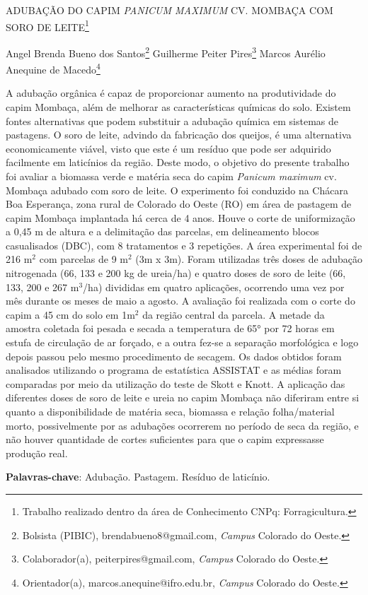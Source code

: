 \documentclass[article,12pt,onesidea,4paper,english,brazil]{abntex2}
\begin{document}
	
	
	\frenchspacing 
	
	\begin{center}
		\LARGE ADUBAÇÃO DO CAPIM \textit{PANICUM MAXIMUM} CV. MOMBAÇA COM SORO DE LEITE\footnote{Trabalho realizado dentro da área de Conhecimento CNPq: Forragicultura.}
		
		\normalsize
		Angel Brenda Bueno dos Santos\footnote{Bolsista (PIBIC), brendabueno8@gmail.com, \textit{Campus} Colorado do Oeste.} 
		Guilherme Peiter Pires\footnote{Colaborador(a), peiterpires@gmail.com, \textit{Campus} Colorado do Oeste.} 
		Marcos Aurélio Anequine de Macedo\footnote{Orientador(a), marcos.anequine@ifro.edu.br, \textit{Campus} Colorado do Oeste.}
	\end{center}
	
	\noindent A adubação orgânica é capaz de proporcionar aumento na produtividade do capim
	Mombaça, além de melhorar as características químicas do solo. Existem fontes
	alternativas que podem substituir a adubação química em sistemas de pastagens. O
	soro de leite, advindo da fabricação dos queijos, é uma alternativa economicamente
	viável, visto que este é um resíduo que pode ser adquirido facilmente em laticínios
	da região. Deste modo, o objetivo do presente trabalho foi avaliar a biomassa verde
	e matéria seca do capim \textit{Panicum maximum} cv. Mombaça adubado com soro de
	leite. O experimento foi conduzido na Chácara Boa Esperança, zona rural de
	Colorado do Oeste (RO) em área de pastagem de capim Mombaça implantada há
	cerca de 4 anos. Houve o corte de uniformização a 0,45 m de altura e a delimitação
	das parcelas, em delineamento blocos casualisados (DBC), com 8 tratamentos e 3
	repetições. A área experimental foi de 216 m$^2$ com parcelas de 9 m$^2$ (3m x 3m).
	Foram utilizadas três doses de adubação nitrogenada (66, 133 e 200 kg de ureia/ha)
	e quatro doses de soro de leite (66, 133, 200 e 267 m$^3$/ha) divididas em quatro
	aplicações, ocorrendo uma vez por mês durante os meses de maio a agosto. A
	avaliação foi realizada com o corte do capim a 45 cm do solo em 1m$^2$ da região
	central da parcela. A metade da amostra coletada foi pesada e secada a
	temperatura de 65° por 72 horas em estufa de circulação de ar forçado, e a outra
	fez-se a separação morfológica e logo depois passou pelo mesmo procedimento de
	secagem. Os dados obtidos foram analisados utilizando o programa de estatística
	ASSISTAT e as médias foram comparadas por meio da utilização do teste de Skott e
	Knott. A aplicação das diferentes doses de soro de leite e ureia no capim Mombaça
	não diferiram entre si quanto a disponibilidade de matéria seca, biomassa e relação
	folha/material morto, possivelmente por as adubações ocorrerem no período de seca
	da região, e não houver quantidade de cortes suficientes para que o capim
	expressasse produção real.
	
	\vspace{\onelineskip}
	
	\noindent
	\textbf{Palavras-chave}: Adubação. Pastagem. Resíduo de laticínio.
	
\end{document}
